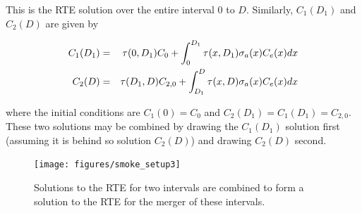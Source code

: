 This is the RTE solution over the entire interval $0$ to $D$. Similarly, $C_1(D_1)$ and $C_2(D)$ are given by

\begin{eqnarray*}
C_1(D_1)&=&\tau(0,D_1)C_0 + \int_0^{D_1}\tau(x,D_1)\sigma_a(x)C_e(x) dx\\
C_2(D)&=&\tau(D_1,D)C_{2,0} + \int_{D_1}^{D}\tau(x,D)\sigma_a(x)C_e(x) dx
\end{eqnarray*}

where the initial conditions are $C_1(0)=C_0$ and $C_2(D_1)=C_1(D_1)=C_{2,0}$.  These two solutions may be combined by drawing the $C_1(D_1)$ solution first (assuming it is behind so solution $C_2(D)$) and drawing $C_2(D)$ second.


\begin{figure}[\figoptions]
\begin{center}
\texttt{[image: figures/smoke\_setup3]}
\end{center}
\caption {Solutions to the RTE for two intervals are combined to form a solution to the RTE
for the merger of these intervals.
}
\label{figsmokesetup3}
\end{figure}
